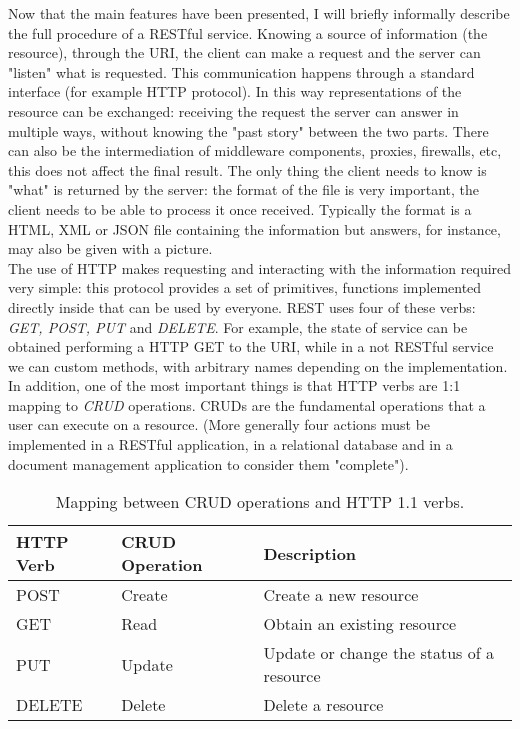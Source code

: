 Now that the main features have been presented, I will briefly informally describe the full procedure of a RESTful service.
Knowing a source of information (the resource), through the URI, the client can make a request and the server can "listen" what is requested. This communication happens through a standard interface (for example HTTP protocol). In this way representations of the resource  can be exchanged: receiving the request the server can answer in multiple ways, without knowing the "past story" between the two parts. There can also be the intermediation of middleware components, proxies, firewalls, etc, this does not affect the final result. The only thing the client needs to know is "what" is returned by the server: the format of the file is very important, the client needs to be able to process it once received. Typically the format is a HTML, XML or JSON file containing the information but answers, for instance, may also  be given with a picture. \\
The use of HTTP makes requesting and interacting with the information required very simple: this protocol provides a set of primitives, functions implemented directly inside that can be used by everyone. REST uses four of these verbs: \textit{GET, POST, PUT} and \textit{DELETE}. For example, the state of service can be obtained performing a HTTP GET to the URI, while in a not RESTful service we can custom methods, with arbitrary names depending on the implementation. In addition, one of the most important things is that HTTP verbs are 1:1 mapping to \textit{CRUD} operations. CRUDs are the fundamental operations that a user can execute on a resource. (More generally four actions must be implemented in a RESTful application, in a relational database and in a document management application to consider them "complete").

\begin{table}[h]
%
\caption{Mapping between CRUD operations and HTTP 1.1 verbs.}
%
\label{tab:crud}
%
\centering
%
\begin{tabular}{lll}
%
\toprule
%
\textbf{HTTP Verb} & \textbf{CRUD Operation} & \textbf{Description}\\
%
\midrule
%
POST & Create	& Create a new resource \\
GET & Read	& Obtain an existing resource \\
PUT & Update	& Update or change the status of a resource \\
DELETE & Delete	& Delete a resource \\
%
\bottomrule
%
\end{tabular}
%
\end{table}

